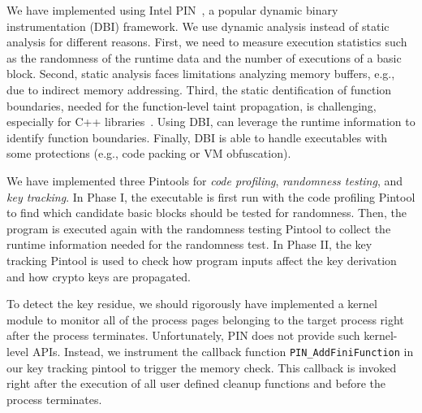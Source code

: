We have implemented \sysname using  Intel \textsf{\small PIN}~\cite{luk2005pin}, 
a popular dynamic binary instrumentation (DBI) framework. 
We use dynamic analysis instead of static analysis for different reasons. 
First, we need to measure execution statistics such as the randomness of the runtime data and the number of executions of a basic block. 
Second, static analysis faces limitations analyzing memory buffers, e.g., due to indirect memory addressing.
Third, the static dentification of function boundaries, 
needed for the function-level taint propagation, is challenging, especially for C++ libraries~\cite{andriessedepth}. 
Using DBI, \sysname can leverage the runtime information to identify function boundaries. 
Finally, DBI is able to handle executables with some protections (e.g., code packing or VM obfuscation). 

We have implemented three Pintools for \emph{code profiling}, \emph{randomness testing}, and \emph{key tracking}. 
In Phase I, the executable is first run with the code profiling Pintool to find which candidate basic blocks should be tested for randomness. 
Then, the program is executed again with the randomness testing Pintool to collect the runtime information needed for the randomness test.
In Phase II, the key tracking Pintool is used to check how program inputs affect the key derivation and how crypto keys are propagated.

To detect the key residue, we should rigorously have implemented a kernel module to monitor all of the process pages belonging to the target process right after the process terminates. 
Unfortunately, PIN does not provide such kernel-level APIs. 
Instead, we instrument the callback function \texttt{PIN\_AddFiniFunction} in our key tracking pintool to trigger the memory check. 
This callback is invoked right after the execution of all user defined cleanup functions and before the process terminates.

